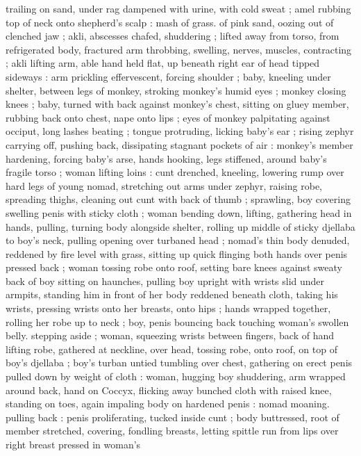 {trailing on sand, under rag dampened with urine, with cold sweat ; 
amel rubbing top of neck onto shepherd's scalp : mash of grass. of 
pink sand, oozing out of clenched jaw ; akli, abscesses chafed, 
shuddering ; lifted away from torso, from refrigerated body, fractured 
arm throbbing, swelling, nerves, muscles, contracting ; akli lifting 
arm, able hand held flat, up beneath right ear of head tipped 
sideways : arm prickling effervescent, forcing shoulder ; baby, 
kneeling under shelter, between legs of monkey, stroking monkey's 
humid eyes ; monkey closing knees ; baby, turned with back against 
monkey's chest, sitting on gluey member, rubbing back onto chest, 
nape onto lips ; eyes of monkey palpitating against occiput, long 
lashes beating ; tongue protruding, licking baby's ear ; rising zephyr 
carrying off, pushing back, dissipating stagnant pockets of air : 
monkey's member hardening, forcing baby's arse, hands hooking, 
legs stiffened, around baby's fragile torso ; woman lifting loins : cunt 
drenched, kneeling, lowering rump over hard legs of young nomad, 
stretching out arms under zephyr, raising robe, spreading thighs, 
cleaning out cunt with back of thumb ; sprawling, boy covering 
swelling penis with sticky cloth ; woman bending down, lifting, 
gathering head in hands, pulling, turning body alongside shelter, 
rolling up middle of sticky djellaba to boy's neck, pulling opening 
over turbaned head ; nomad's thin body denuded, reddened by fire 
level with grass, sitting up quick flinging both hands over penis 
pressed back ; woman tossing robe onto roof, setting bare knees 
against sweaty back of boy sitting on haunches, pulling boy upright 
with wrists slid under armpits, standing him in front of her body 
reddened beneath cloth, taking his wrists, pressing wrists onto her 
breasts, onto hips ; hands wrapped together, rolling her robe up to 
neck ; boy, penis bouncing back touching woman's swollen belly. 
stepping aside ; woman, squeezing wrists between fingers, back of 
hand lifting robe, gathered at neckline, over head, tossing robe, onto 
roof, on top of boy's djellaba ; boy's turban untied tumbling over 
chest, gathering on erect penis pulled down by weight of cloth : 
woman, hugging boy shuddering, arm wrapped around back, hand on 
Coccyx, flicking away bunched cloth with raised knee, standing on 
toes, again impaling body on hardened penis : nomad moaning. 
pulling back : penis proliferating, tucked inside cunt ; body 
buttressed, root of member stretched, covering, fondling breasts, 
letting spittle run from lips over right breast pressed in woman's 
}
